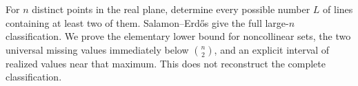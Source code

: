 For $n$ distinct points in the real plane, determine every possible number $L$ of lines containing at least two of them. Salamon--Erd\H{o}s give the full large-$n$ classification. We prove the elementary lower bound for noncollinear sets, the two universal missing values immediately below $\binom n2$, and an explicit interval of realized values near that maximum. This does not reconstruct the complete classification.
